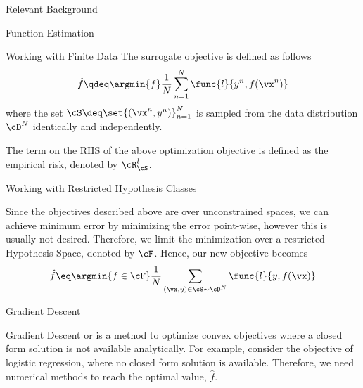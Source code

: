 \documentclass{article}
\begin{document}
\begin{psection}{Relevant Background}
\begin{psubsection}{Function Estimation}
\begin{pssubsection}{Working with Finite Data}
			The surrogate objective is defined as follows
			\begin{align*}
				\hat{f} \qdeq \argmin{f} \frac{1}{N} \sum_{n = 1}^N \func{l}{y^n, f(\vx^n)}
			\end{align*}
			where the set $\cS \deq \set{(\vx^n, y^n)}_{n = 1}^N$ is sampled from the data distribution $\cD^N$ identically and independently.

			\begin{remark}
				The term on the RHS of the above optimization objective is defined as the empirical risk, denoted by $\cR_\cS^l$.
			\end{remark}

		\end{pssubsection}

		\begin{pssubsection}{Working with Restricted Hypothesis Classes}

			Since the objectives described above are over unconstrained spaces, we can achieve minimum error by minimizing the error point-wise, however this is usually not desired. Therefore, we limit the minimization over a restricted Hypothesis Space, denoted by $\cF$. Hence, our new objective becomes
			\begin{align*}
				\hat{f} \eq \argmin{f \in \cF} \frac{1}{N} \sum_{(\vx, y) \in \cS \sim \cD^N} \func{l}{y, f(\vx)}
			\end{align*}

		\end{pssubsection}

	\end{psubsection}

	\begin{psubsection}{Gradient Descent}

		Gradient Descent or  is a method to optimize convex objectives where a closed form solution is not available analytically. For example, consider the objective of logistic regression, where no closed form solution is available. Therefore, we need numerical methods to reach the optimal value, $\hat{f}$.


\end{psubsection}
\end{psection}
\end{document}
